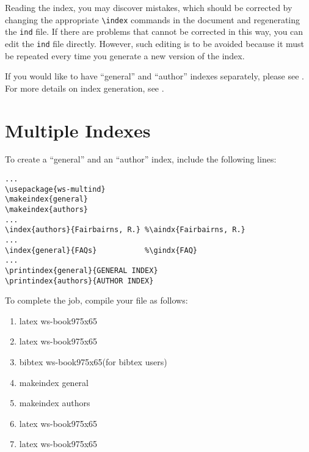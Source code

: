 Reading the index, you may discover mistakes, which
should be corrected by changing the appropriate \verb|\index|
commands in the document and regenerating the {\tt ind} file.  If
there are problems that cannot be corrected in this way, you can
edit the {\tt ind} file directly.  However, such editing is
to be avoided because it must be repeated every time you generate a
new version of the index.

If you would like to have ``general'' and ``author'' indexes
separately, please see . For more details on index
generation, see \cite{lamp87}.

\section{Multiple Indexes}\label{sec3.1}

To create a ``general'' and an ``author'' index, include the following lines:

\begin{verbatim}
...
\usepackage{ws-multind}
\makeindex{general}
\makeindex{authors}
...
\index{authors}{Fairbairns, R.} %\aindx{Fairbairns, R.}
...
\index{general}{FAQs}           %\gindx{FAQ}
...
\printindex{general}{GENERAL INDEX}
\printindex{authors}{AUTHOR INDEX}
\end{verbatim}

To complete the job, compile your file as follows:

\begin{enumerate}
\item latex ws-book975x65
\item latex ws-book975x65
\item bibtex ws-book975x65\qquad(for bibtex users)
\item makeindex general
\item makeindex authors
\item latex ws-book975x65
\item latex ws-book975x65
\end{enumerate}
